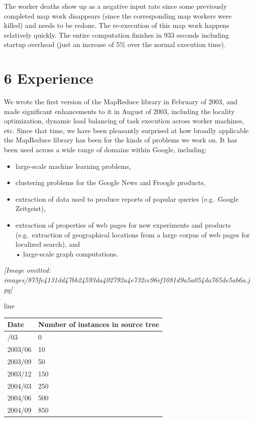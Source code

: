 \documentclass[
]{article}
\newcounter{none} %
\providecommand{\tightlist}{%
  \setlength{\itemsep}{0pt}\setlength{\parskip}{0pt}}
\begin{document}
The worker deaths show up as a negative input rate since some previously
completed map work disappears (since the corresponding map workers were
killed) and needs to be redone. The re-execution of this map work
happens relatively quickly. The entire computation finishes in 933
seconds including startup overhead (just an increase of 5\% over the
normal execution time).

\section{6 Experience}\label{experience}

We wrote the first version of the MapReduce library in February of 2003,
and made significant enhancements to it in August of 2003, including the
locality optimization, dynamic load balancing of task execution across
worker machines, etc. Since that time, we have been pleasantly surprised
at how broadly applicable the MapReduce library has been for the kinds
of problems we work on. It has been used across a wide range of domains
within Google, including:

\begin{itemize}
\tightlist
\item
  large-scale machine learning problems,\\
\item
  clustering problems for the Google News and Froogle products,\\
\item
  extraction of data used to produce reports of popular queries
  (e.g.~Google Zeitgeist),\\
\item
  extraction of properties of web pages for new experiments and products
  (e.g.~extraction of geographical locations from a large corpus of web
  pages for localized search), and\\
  • large-scale graph computations.
\end{itemize}

\textit{[Image omitted: images/875fe4131dd47bb24593da402792a4e732cc96ef1081d9a5a054da765de5ab6a.jpg]}

line

{\def\LTcaptype{none} %
\begin{longtable}[]{@{}ll@{}}
\toprule\noalign{}
Date & Number of instances in source tree \\
\midrule\noalign{}
\endhead
\bottomrule\noalign{}
\endlastfoot
2003/03 & 0 \\
2003/06 & 10 \\
2003/09 & 50 \\
2003/12 & 150 \\
2004/03 & 250 \\
2004/06 & 500 \\
2004/09 & 850 \\
\end{longtable}
}
\end{document}
